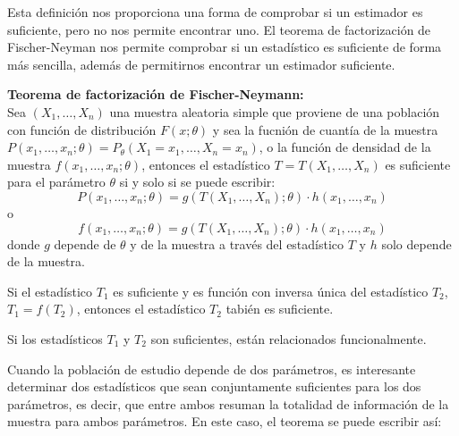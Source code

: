 Esta definici\'on nos proporciona una forma de comprobar si un estimador es suficiente, pero no nos permite encontrar uno. El teorema de factorizaci\'on de Fischer-Neyman nos permite comprobar si un estad\'istico es suficiente de forma m\'as sencilla, adem\'as de permitirnos encontrar un estimador suficiente.

\begin{teorema}
\textbf{Teorema de factorizaci\'on de Fischer-Neymann:}\\
Sea $(X_1,\ldots,X_n)$ una muestra aleatoria simple que proviene de una poblaci\'on con funci\'on de distribuci\'on $F(x;\theta)$ y sea la fucni\'on de cuant\'ia de la muestra $P(x_1,\ldots,x_n;\theta)=P_{\theta}(X_1=x_1,\ldots,X_n=x_n)$, o la funci\'on de densidad de la muestra $f(x_1,\ldots,x_n;\theta)$, entonces el estad\'istico $T=T(X_1,\ldots,X_n)$ es suficiente para el par\'ametro $\theta$ si y solo si se puede escribir:
\begin{equation*}
P(x_1,\ldots,x_n;\theta)=g(T(X_1,\ldots,X_n);\theta)\cdot h(x_1,\ldots,x_n)
\end{equation*}
o
\begin{equation*}
f(x_1,\ldots,x_n;\theta)=g(T(X_1,\ldots,X_n);\theta)\cdot h(x_1,\ldots,x_n)
\end{equation*}
donde $g$ depende de $\theta$ y de la muestra a trav\'es del estad\'istico $T$ y $h$ solo depende de la muestra.
\end{teorema}


\begin{teorema}
Si el estad\'istico $T_1$ es suficiente y es funci\'on con inversa \'unica del estad\'istico $T_2$, $T_1=f(T_2)$, entonces el estad\'istico $T_2$ tabi\'en es suficiente.
\end{teorema}

\begin{teorema}
Si los estad\'isticos $T_1$ y $T_2$ son suficientes, est\'an relacionados funcionalmente.
\end{teorema}

Cuando la poblaci\'on de estudio depende de dos par\'ametros, es interesante determinar dos estad\'isticos que sean conjuntamente suficientes para los dos par\'ametros, es decir, que entre ambos resuman la totalidad de informaci\'on de la muestra para ambos par\'ametros. En este caso, el teorema se puede escribir as\'i:


